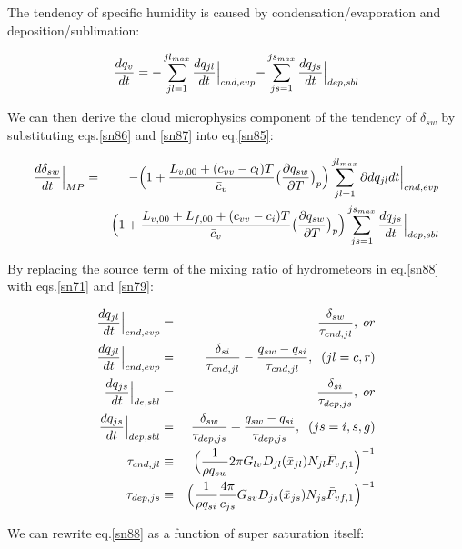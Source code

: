 The tendency of specific humidity is caused by condensation/evaporation and deposition/sublimation:

\begin{eqnarray}
\frac{dq_{v}}{dt}=-\sum_{jl=1}^{jl_{max}}\frac{dq_{jl}}{dt}\Bigl|_{cnd,evp}-\sum_{js=1}^{js_{max}}\frac{dq_{js}}{dt}\Bigr|_{dep,sbl}\label{sn87}
\end{eqnarray}

We can then derive the cloud microphysics component of the tendency of $\delta_{sw}$ by substituting eqs.\ref{sn86} and \ref{sn87} into eq.\ref{sn85}:

\begin{eqnarray}
\frac{d\delta_{sw}}{dt}\Bigr|_{MP}&=&-\Bigl(1+\frac{L_{v,00}+(c_{vv}-c_{l})T}{\bar{c}_{v}}\bigl(\frac{\partial q_{sw}}{\partial T}\bigr)_{p}\Bigr)\sum_{jl=1}^{jl_{max}}\partial{dq_{jl}}{dt}\Bigr|_{cnd,evp}\nonumber\\
&-&\Bigl(1+\frac{L_{v,00}+L_{f,00}+(c_{vv}-c_{i})T}{\bar{c}_{v}}\bigl(\frac{\partial q_{sw}}{\partial T}\bigr)_{p}\Bigr)\sum^{js_{max}}_{js=1}\frac{dq_{js}}{dt}\Bigr|_{dep,sbl}\label{sn88}
\end{eqnarray}

By replacing the source term of the mixing ratio of hydrometeors in eq.\ref{sn88} with eqs.\ref{sn71} and \ref{sn79}:

\begin{eqnarray}
\frac{dq_{jl}}{dt}\Bigr|_{cnd,evp}&=&\frac{\delta_{sw}}{\tau_{cnd,jl}},\;or\nonumber\\
\frac{dq_{jl}}{dt}\Bigr|_{cnd,evp}&=&\frac{\delta_{si}}{\tau_{cnd,jl}}-\frac{q_{sw}-q_{si}}{\tau_{cnd,jl}},\;\;(jl=c,r)\label{89}\\
\frac{dq_{js}}{dt}\Bigr|_{de,sbl}&=&\frac{\delta_{si}}{\tau_{dep,js}},\;or\nonumber\\
\frac{dq_{js}}{dt}\Bigr|_{dep,sbl}&=&\frac{\delta_{sw}}{\tau_{dep,js}}+\frac{q_{sw}-q_{si}}{\tau_{dep,js}},\;\;(js=i,s,g)\label{90}\\
\tau_{cnd,jl} &\equiv& \Bigl(\frac{1}{\rho q_{sw}} 2\pi G_{lv}D_{jl}(\bar{x}_{jl})N_{jl}\bar{F}_{vf,1}\Bigr)^{-1}\label{sn91}\\
\tau_{dep,js} &\equiv& \Bigl(\frac{1}{\rho q_{si}}\frac{4\pi}{c_{js}}G_{sv}D_{js}(\bar{x}_{js})N_{js}\bar{F}_{vf,1}\Bigr)^{-1}\label{sn92}
\end{eqnarray}


We can rewrite eq.\ref{sn88} as a function of super saturation itself:

